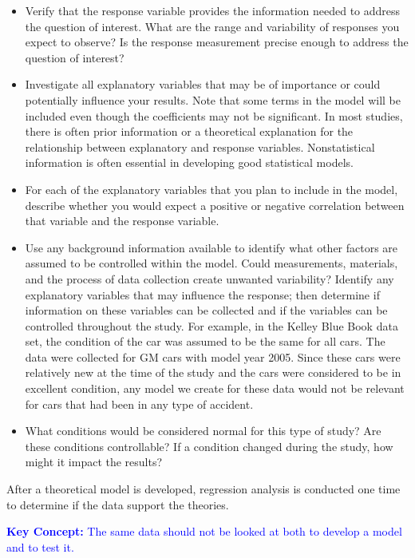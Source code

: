 \documentclass[
]{report}
\begin{document}
\begin{itemize}
\item
  Verify that the response variable provides the information needed to address the question of interest. What are the range and variability of responses you expect to observe? Is the response measurement precise enough to address the question of interest?
\item
  Investigate all explanatory variables that may be of importance or could potentially influence your results. Note that some terms in the model will be included even though the coefficients may not be significant. In most studies, there is often prior information or a theoretical explanation for the relationship between explanatory and response variables. Nonstatistical information is often essential in developing good statistical models.
\item
  For each of the explanatory variables that you plan to include in the model, describe whether you would expect a positive or negative correlation between that variable and the response variable.
\item
  Use any background information available to identify what other factors are assumed to be controlled within the model. Could measurements, materials, and the process of data collection create unwanted variability? Identify any explanatory variables that may influence the response; then determine if information on these variables can be collected and if the variables can be controlled throughout the study. For example, in the Kelley Blue Book data set, the condition of the car was assumed to be the same for all cars. The data were collected for GM cars with model year 2005. Since these cars were relatively new at the time of the study and the cars were considered to be in excellent condition, any model we create for these data would not be relevant for cars that had been in any type of accident.
\item
  What conditions would be considered normal for this type of study? Are these conditions controllable? If a condition changed during the study, how might it impact the results?
\end{itemize}

After a theoretical model is developed, regression analysis is conducted one time to determine if the data support the theories.

\textbf{\textcolor{blue}{Key Concept:}}
\textcolor{blue}{The same data should not be looked at both to develop a model and to test it.}
\end{document}
